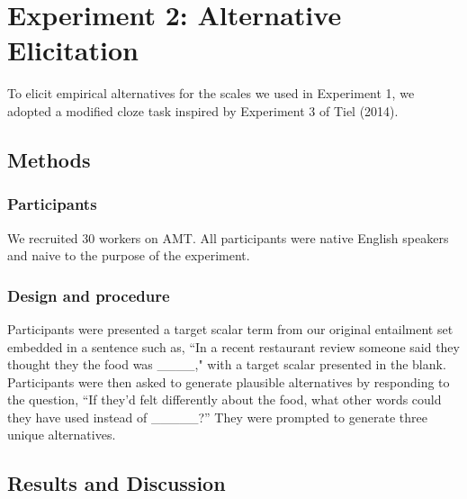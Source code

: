 \documentclass[10pt, letterpaper]{article}
\begin{document}
\section{Experiment 2: Alternative
Elicitation}\label{experiment-2-alternative-elicitation}

To elicit empirical alternatives for the scales we used in Experiment 1,
we adopted a modified cloze task inspired by Experiment 3 of Tiel
(2014).

\subsection{Methods}\label{methods-1}

\subsubsection{Participants}\label{participants-1}

We recruited 30 workers on AMT. All participants were native English
speakers and naive to the purpose of the experiment.

\subsubsection{Design and procedure}\label{design-and-procedure-1}

Participants were presented a target scalar term from our original
entailment set embedded in a sentence such as, ``In a recent restaurant
review someone said they thought they the food was \_\_\_\_," with a
target scalar presented in the blank. Participants were then asked to
generate plausible alternatives by responding to the question, ``If
they'd felt differently about the food, what other words could they have
used instead of \_\_\_\_\_?'' They were prompted to generate three
unique alternatives.

\subsection{Results and Discussion}\label{results-and-discussion-1}
\end{document}
